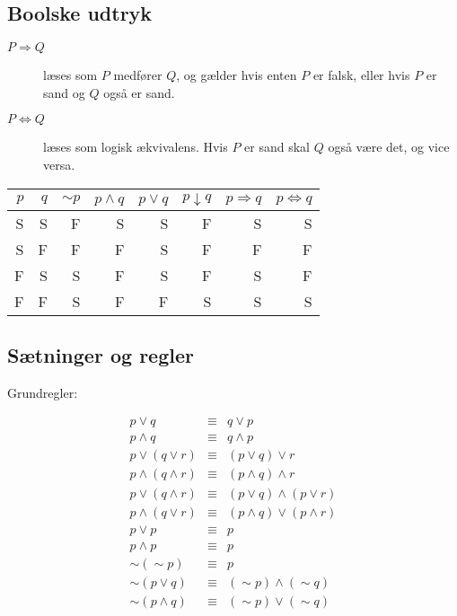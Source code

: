 \documentclass[a4paper]{article}
\begin{document}
\subsection{Boolske udtryk}

\begin{description}
\item[$P \Rightarrow Q$] læses som $P$ medfører $Q$, og gælder hvis enten $P$ er falsk,
  eller hvis $P$ er sand og $Q$ også er sand.
\item[$P \Leftrightarrow Q$] læses som logisk ækvivalens. Hvis $P$ er sand skal $Q$ også
  være det, og vice versa.
\end{description}

\begin{center}
\begin{tabular} {|r|r||r|r|r|r|r|r|}
  \hline
  $p$ & $q$  & $\sim{}p$ &  $p\wedge{}q$ &  $p\vee{}q$ &  $p\downarrow{}q$  &  $p\Rightarrow{}q$  &  $p\Leftrightarrow{}q$ \\
  \hline
  \hline
  S&S&F&S&S&F&S&S\\
  \hline
  S&F&F&F&S&F&F&F\\
  \hline
  F&S&S&F&S&F&S&F\\
  \hline
  F&F&S&F&F&S&S&S\\
  \hline
\end{tabular}
\end{center}

\subsection{Sætninger og regler}

Grundregler:

\begin{eqnarray}
p \vee q &\equiv& q \vee p \\
p \wedge q &\equiv& q \wedge p \\
p \vee (q \vee r) &\equiv& (p \vee q) \vee r \\
p \wedge (q \wedge r) &\equiv& (p \wedge q) \wedge r \\
p \vee (q \wedge r) &\equiv& (p \vee q) \wedge (p \vee r) \\
p \wedge (q \vee r) &\equiv& (p \wedge q) \vee (p \wedge r) \\
p \vee p &\equiv& p \\
p \wedge p &\equiv& p \\
\sim (\sim p) &\equiv& p \\
\sim (p \vee q) &\equiv& (\sim p) \wedge (\sim q) \\
\sim (p \wedge q) &\equiv& (\sim p) \vee (\sim q) 
\end{eqnarray}
\end{document}
